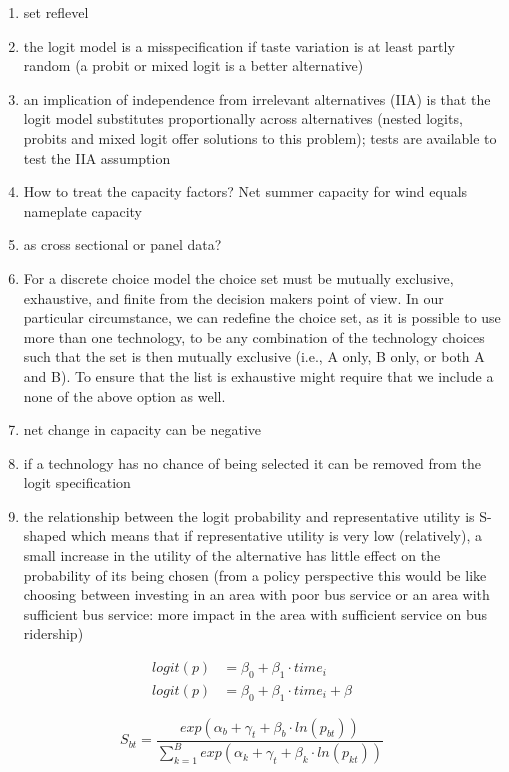 \documentclass[10pt]{amsart}
\begin{document}
\begin{enumerate}
	\item set reflevel
	\item the logit model is a misspecification if taste variation is at least partly random (a probit or mixed logit is a better alternative)
	\item an implication of independence from irrelevant alternatives (IIA) is that the logit model substitutes proportionally across alternatives (nested logits, probits and mixed logit offer solutions to this problem); tests are available to test the IIA assumption
	\item How to treat the capacity factors? Net summer capacity for wind equals nameplate capacity
	\item as cross sectional or panel data? 
	\item For a discrete choice model the choice set must be mutually exclusive, exhaustive, and finite from the decision makers point of view. In our particular circumstance, we can redefine the choice set, as it is possible to use more than one technology, to be any combination of the technology choices such that the set is then mutually exclusive (i.e., A only, B only, or both A and B). To ensure that the list is exhaustive might require that we include a none of the above option as well.
	\item net change in capacity can be negative
	\item if a technology has no chance of being selected it can be removed from the logit specification
	\item the relationship between the logit probability and representative utility is S-shaped which means that if representative utility is very low (relatively), a small increase in the utility of the alternative has little effect on the probability of its being chosen (from a policy perspective this would be like choosing between investing in an area with poor bus service or an area with sufficient bus service: more impact in the area with sufficient service on bus ridership)
\end{enumerate}
\begin{align}
logit(p) &= \beta_0 + \beta_1 \cdot time_{i} \\
logit(p) &= \beta_{0} + \beta_1\cdot time_{i} + \beta
\end{align}

\begin{equation} \label{MCI}
S_{bt} = \frac{exp\left(\alpha_{b} + \gamma_{t} + \beta_b \cdot ln(p_{bt})\right)}{\sum_{k=1}^B exp\left(\alpha_k + \gamma_{t} + \beta_k \cdot ln(p_{kt})\right)}
\end{equation}
\end{document}
